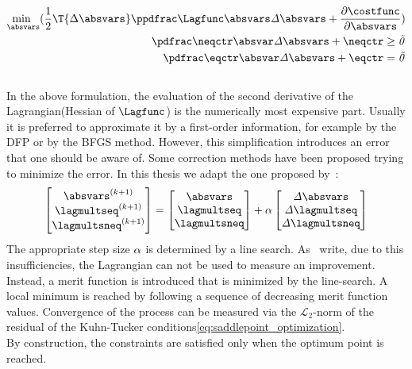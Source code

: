 \documentclass[../main.tex]{subfiles}
\begin{document}
\begin{align}
\underset{\absvars}{\text{min }}( \frac{1}{2} \T{\incrabsvars} \it{\PPLagfuncBYabsvars} \incrabsvars + \frac{\partial \it{\costfunc}}{\partial \absvars} ) \nonumber \\
\it{\PneqctrBYabsvars} \incrabsvars+\it{\neqctr} \geq \vec{0} \nonumber\\
\it{\PeqctrBYabsvars} \incrabsvars+\it{\eqctr} = \vec{0} \label{eq:quadratic_minimization_problem_3}
\end{align}
\\
In the above formulation, the evaluation of the second derivative of the Lagrangian(Hessian of $\Lagfunc$) is the numerically most expensive part. Usually it is preferred to approximate it by a first-order information, for example by the \ac{DFP} or by the \ac{BFGS} method. However, this simplification introduces an error that one should be aware of. Some correction methods have been proposed trying to minimize the error. In this thesis we adapt the one proposed by~\cite{Maute2001}:
\begin{align}\label{eq:correction_step}
\begin{bmatrix}
\absvars^{(k+1)} \\
\lagmultseq^{(k+1)} \\
\lagmultsneq^{(k+1)}
\end{bmatrix} =
  \begin{bmatrix}
  \it{\absvars} \\
  \it{\lagmultseq} \\
  \it{\lagmultsneq} \\
  \end{bmatrix} +
    \it{\alpha}
    \begin{bmatrix}
    \it{\incrabsvars} \\
    \it{\incrlagmultseq} \\
    \it{\incrlagmultsneq} \\
    \end{bmatrix}
\end{align}
The appropriate step size $\it{\alpha}$ is determined by a line search. As~\cite{Maute2001} write, due to this insufficiencies, the Lagrangian can not be used to measure an improvement. Instead, a merit function is introduced that is minimized by the line-search. A local minimum is reached by following a sequence of decreasing merit function values. Convergence of the process can be measured via the $\mathcal{L}_2$-norm of the residual of the Kuhn-Tucker conditions\eqref{eq:saddlepoint_optimization}.\\
By construction, the constraints are satisfied only when the optimum point is reached.
\end{document}
